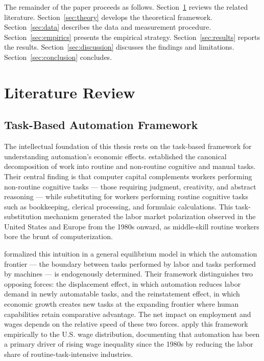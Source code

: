 \documentclass[12pt,a4paper]{article}
\begin{document}
The remainder of the paper proceeds as follows. Section~\ref{sec:literature} reviews the related literature. Section~\ref{sec:theory} develops the theoretical framework. Section~\ref{sec:data} describes the data and measurement procedure. Section~\ref{sec:empirics} presents the empirical strategy. Section~\ref{sec:results} reports the results. Section~\ref{sec:discussion} discusses the findings and limitations. Section~\ref{sec:conclusion} concludes.
\section{Literature Review}
\label{sec:literature}

\subsection{Task-Based Automation Framework}

The intellectual foundation of this thesis rests on the task-based framework for understanding automation's economic effects. \citet{autor2003} established the canonical decomposition of work into routine and non-routine cognitive and manual tasks. Their central finding is that computer capital complements workers performing non-routine cognitive tasks --- those requiring judgment, creativity, and abstract reasoning --- while substituting for workers performing routine cognitive tasks such as bookkeeping, clerical processing, and formulaic calculations. This task-substitution mechanism generated the labor market polarization observed in the United States and Europe from the 1980s onward, as middle-skill routine workers bore the brunt of computerization.

\citet{acemoglu2018} formalized this intuition in a general equilibrium model in which the automation frontier --- the boundary between tasks performed by labor and tasks performed by machines --- is endogenously determined. Their framework distinguishes two opposing forces: the displacement effect, in which automation reduces labor demand in newly automatable tasks, and the reinstatement effect, in which economic growth creates new tasks at the expanding frontier where human capabilities retain comparative advantage. The net impact on employment and wages depends on the relative speed of these two forces. \citet{acemoglu2022} apply this framework empirically to the U.S. wage distribution, documenting that automation has been a primary driver of rising wage inequality since the 1980s by reducing the labor share of routine-task-intensive industries.
\end{document}
